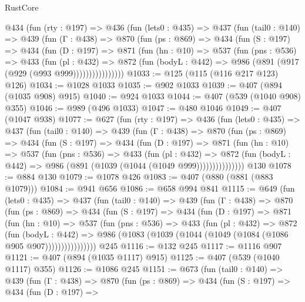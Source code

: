 \begin{lexlean}{RustCore}
\begin{coremodule}
    @434
      (fun (rty : @197) =>
      @436
        (fun (lets0 : @435) =>
        @437
          (fun (tail0 : @140) =>
          @439
            (fun (Γ : @438) =>
            @870
              (fun (ps : @869) =>
              @434
                (fun (S : @197) =>
                @434
                  (fun (D : @197) =>
                  @871
                    (fun (hn : @10) =>
                    @537
                      (fun (pns : @536) =>
                      @433
                        (fun (pl : @432) =>
                        @872
                          (fun (bodyL : @442) => @986 (@891 (@917 (@929 (@993 @999))))))))))))))))
@1033 := @125 (@115 (@116 @217 @123) @126)
@1034 := @1028 @1033
@1035 := @902 @1033
@1039 := @407 (@894 (@1035 @908) @915)
@1040 := @924 @1033
@1044 := @407 (@539 (@1040 @908) @355)
@1046 := @989 (@496 @1033)
@1047 := @480 @1046
@1049 := @407 (@1047 @938)
@1077 := @627
    (fun (rty : @197) =>
    @436
      (fun (lets0 : @435) =>
      @437
        (fun (tail0 : @140) =>
        @439
          (fun (Γ : @438) =>
          @870
            (fun (ps : @869) =>
            @434
              (fun (S : @197) =>
              @434
                (fun (D : @197) =>
                @871
                  (fun (hn : @10) =>
                  @537
                    (fun (pns : @536) =>
                    @433
                      (fun (pl : @432) =>
                      @872
                        (fun (bodyL : @442) => @986 (@891 (@1039 (@1044 (@1049 @999)))))))))))))))
    @130
@1078 := @884 @130
@1079 := @1078 @426
@1083 := @407 (@880 (@881 (@883 @1079)))
@1084 := @941 @656
@1086 := @658 @994 @841
@1115 := @649
    (fun (lets0 : @435) =>
    @437
      (fun (tail0 : @140) =>
      @439
        (fun (Γ : @438) =>
        @870
          (fun (ps : @869) =>
          @434
            (fun (S : @197) =>
            @434
              (fun (D : @197) =>
              @871
                (fun (hn : @10) =>
                @537
                  (fun (pns : @536) =>
                  @433
                    (fun (pl : @432) =>
                    @872
                      (fun (bodyL : @442) =>
                      @986 (@1083 (@1039 (@1044 (@1049 (@1084 (@1086 @905 @907))))))))))))))))
    @245
@1116 := @132 @245
@1117 := @1116 @907
@1121 := @407 (@894 (@1035 @1117) @915)
@1125 := @407 (@539 (@1040 @1117) @355)
@1126 := @1086 @245
@1151 := @673
    (fun (tail0 : @140) =>
    @439
      (fun (Γ : @438) =>
      @870
        (fun (ps : @869) =>
        @434
          (fun (S : @197) =>
          @434
            (fun (D : @197) =>

\end{coremodule}
\end{lexlean}
